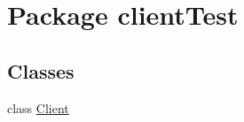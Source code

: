\hypertarget{namespaceclient_test}{}\section{Package client\+Test}
\label{namespaceclient_test}
\subsection*{Classes}
\begin{DoxyCompactItemize}
\item 
class \hyperlink{classclient_test_1_1_client}{Client}
\end{DoxyCompactItemize}

